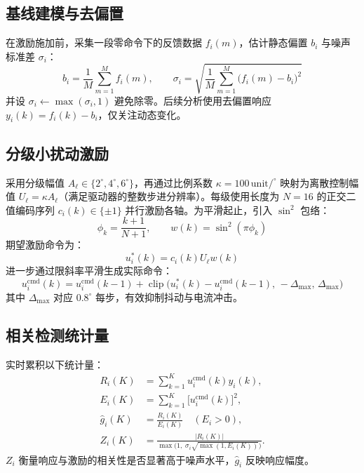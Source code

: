 \documentclass{ctexart}
\begin{document}
\subsection{基线建模与去偏置}

在激励施加前，采集一段零命令下的反馈数据 $f_i(m)$，估计静态偏置 $b_i$ 与噪声标准差 $\sigma_i$：
\begin{equation}
  b_i = \frac{1}{M}\sum_{m=1}^{M} f_i(m), \qquad \sigma_i = \sqrt{\frac{1}{M}\sum_{m=1}^{M}\bigl(f_i(m)-b_i\bigr)^2}
\end{equation}
并设 $\sigma_i \leftarrow \max(\sigma_i,1)$ 避免除零。后续分析使用去偏置响应 $y_i(k) = f_i(k) - b_i$，仅关注动态变化。

\subsection{分级小扰动激励}

采用分级幅值 $A_\ell \in \{2^{\circ},4^{\circ},6^{\circ}\}$，再通过比例系数 $\kappa=100\,\text{unit}/^{\circ}$ 映射为离散控制幅值 $U_\ell = \kappa A_\ell$（满足驱动器的整数步进分辨率）。每级使用长度为 $N=16$ 的正交二值编码序列 $c_i(k) \in \{\pm1\}$ 并行激励各轴。为平滑起止，引入 $\sin^2$ 包络：
\begin{equation}
  \phi_k = \frac{k+1}{N+1}, \qquad w(k) = \sin^2(\pi \phi_k)
\end{equation}
期望激励命令为：
\begin{equation}
  u_i^*(k) = c_i(k) U_\ell w(k)
\end{equation}
进一步通过限斜率平滑生成实际命令：
\begin{equation}
  u_i^{\text{cmd}}(k) = u_i^{\text{cmd}}(k-1) + \operatorname{clip}\bigl(u_i^*(k)-u_i^{\text{cmd}}(k-1),\,-\Delta_{\max},\, \Delta_{\max}\bigr)
\end{equation}
其中 $\Delta_{\max}$ 对应 $0.8^{\circ}$ 每步，有效抑制抖动与电流冲击。

\subsection{相关检测统计量}

实时累积以下统计量：
\begin{align}
  R_i(K) &= \sum_{k=1}^{K} u_i^{\text{cmd}}(k) y_i(k),\\
  E_i(K) &= \sum_{k=1}^{K} \bigl[u_i^{\text{cmd}}(k)\bigr]^2,\\
  \hat g_i(K) &= \frac{R_i(K)}{E_i(K)} \quad (E_i>0),\\
  Z_i(K) &= \frac{\bigl|R_i(K)\bigr|}{\max\bigl(1,\; \sigma_i \sqrt{\max(1,E_i(K))}\bigr)}.
\end{align}
$Z_i$ 衡量响应与激励的相关性是否显著高于噪声水平，$\hat g_i$ 反映响应幅度。
\end{document}
